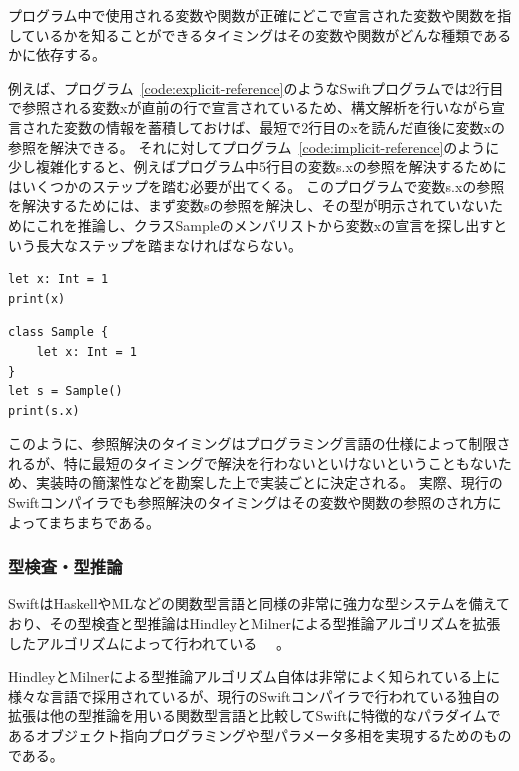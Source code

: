 プログラム中で使用される変数や関数が正確にどこで宣言された変数や関数を指しているかを知ることができるタイミングはその変数や関数がどんな種類であるかに依存する。

例えば、プログラム~\ref{code:explicit-reference}のようなSwiftプログラムでは2行目で参照される変数xが直前の行で宣言されているため、構文解析を行いながら宣言された変数の情報を蓄積しておけば、最短で2行目のxを読んだ直後に変数xの参照を解決できる。
それに対してプログラム~\ref{code:implicit-reference}のように少し複雑化すると、例えばプログラム中5行目の変数s.xの参照を解決するためにはいくつかのステップを踏む必要が出てくる。
このプログラムで変数s.xの参照を解決するためには、まず変数sの参照を解決し、その型が明示されていないためにこれを推論し、クラスSampleのメンバリストから変数xの宣言を探し出すという長大なステップを踏まなければならない。

\begin{lstlisting}[caption=直ちに変数解決が可能である例, label=code:explicit-reference]
let x: Int = 1
print(x)
\end{lstlisting}

\begin{lstlisting}[caption=変数解決までに複数の処理が必要となる例, label=code:implicit-reference]
class Sample {
    let x: Int = 1
}
let s = Sample()
print(s.x)
\end{lstlisting}

このように、参照解決のタイミングはプログラミング言語の仕様によって制限されるが、特に最短のタイミングで解決を行わないといけないということもないため、実装時の簡潔性などを勘案した上で実装ごとに決定される。
実際、現行のSwiftコンパイラでも参照解決のタイミングはその変数や関数の参照のされ方によってまちまちである。

\subsubsection{型検査・型推論}

SwiftはHaskellやMLなどの関数型言語と同様の非常に強力な型システムを備えており、その型検査と型推論はHindleyとMilnerによる型推論アルゴリズムを拡張したアルゴリズムによって行われている~\cite{swift-type-checker} ~\cite{tapl}。

HindleyとMilnerによる型推論アルゴリズム自体は非常によく知られている上に様々な言語で採用されているが、現行のSwiftコンパイラで行われている独自の拡張は他の型推論を用いる関数型言語と比較してSwiftに特徴的なパラダイムであるオブジェクト指向プログラミングや型パラメータ多相を実現するためのものである。

